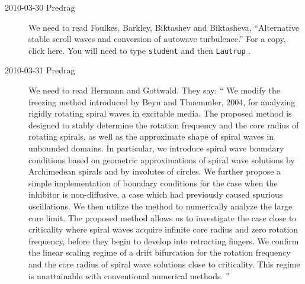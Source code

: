 \begin{description}
\item[2010-03-30 Predrag]
We need to read
Foulkes, Barkley, Biktashev and Biktasheva,
``Alternative stable scroll waves and conversion of autowave turbulence.''
For a copy, 
{click here}. You will need to type \texttt{student} and then \texttt{Lautrup} .


\item[2010-03-31 Predrag]
We need to read
    {Hermann and Gottwald}. They say:
``
We modify the freezing method introduced by Beyn and
Thuemmler, 2004, for analyzing rigidly rotating spiral waves
in excitable media. The proposed method is designed to stably
determine the rotation frequency and the core radius of
rotating spirals, as well as the approximate shape of spiral
waves in unbounded domains. In particular, we introduce
spiral wave boundary conditions based on geometric
approximations of spiral wave solutions by Archimedean
spirals and by involutes of circles. We further propose a
simple implementation of boundary conditions for the case
when the inhibitor is non-diffusive, a case which had
previously caused spurious oscillations.
We then utilize the method to numerically analyze the large
core limit. The proposed method allows us to investigate the
case close to criticality where spiral waves acquire infinite
core radius and zero rotation frequency, before they begin to
develop into retracting fingers. We confirm the linear
scaling regime of a drift bifurcation for the rotation
frequency and the core radius of spiral wave solutions close
to criticality. This regime is unattainable with conventional
numerical methods.
''



\end{description}
